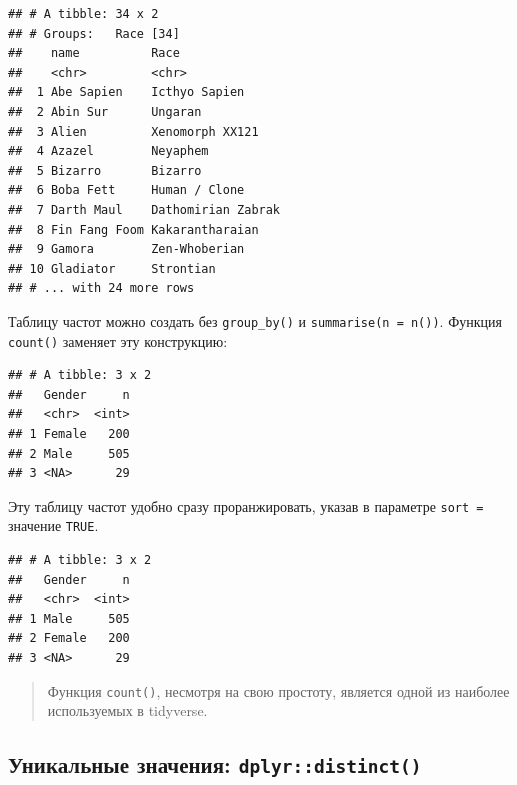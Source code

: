 \documentclass[]{book}
\newenvironment{Shaded}{\begin{snugshade}}{\end{snugshade}}
\newcommand{\KeywordTok}[1]{\textcolor[rgb]{0.13,0.29,0.53}{\textbf{#1}}}
\newcommand{\DataTypeTok}[1]{\textcolor[rgb]{0.13,0.29,0.53}{#1}}
\newcommand{\StringTok}[1]{\textcolor[rgb]{0.31,0.60,0.02}{#1}}
\newcommand{\OtherTok}[1]{\textcolor[rgb]{0.56,0.35,0.01}{#1}}
\newcommand{\OperatorTok}[1]{\textcolor[rgb]{0.81,0.36,0.00}{\textbf{#1}}}
\newcommand{\NormalTok}[1]{#1}
\begin{document}
\begin{verbatim}
## # A tibble: 34 x 2
## # Groups:   Race [34]
##    name          Race              
##    <chr>         <chr>             
##  1 Abe Sapien    Icthyo Sapien     
##  2 Abin Sur      Ungaran           
##  3 Alien         Xenomorph XX121   
##  4 Azazel        Neyaphem          
##  5 Bizarro       Bizarro           
##  6 Boba Fett     Human / Clone     
##  7 Darth Maul    Dathomirian Zabrak
##  8 Fin Fang Foom Kakarantharaian   
##  9 Gamora        Zen-Whoberian     
## 10 Gladiator     Strontian         
## # ... with 24 more rows
\end{verbatim}

Таблицу частот можно создать без \texttt{group\_by()} и
\texttt{summarise(n\ =\ n())}. Функция \texttt{count()} заменяет эту
конструкцию:

\begin{Shaded}
\end{Shaded}

\begin{verbatim}
## # A tibble: 3 x 2
##   Gender     n
##   <chr>  <int>
## 1 Female   200
## 2 Male     505
## 3 <NA>      29
\end{verbatim}

Эту таблицу частот удобно сразу проранжировать, указав в параметре
\texttt{sort\ =} значение \texttt{TRUE}.

\begin{Shaded}
\end{Shaded}

\begin{verbatim}
## # A tibble: 3 x 2
##   Gender     n
##   <chr>  <int>
## 1 Male     505
## 2 Female   200
## 3 <NA>      29
\end{verbatim}

\begin{quote}
Функция \texttt{count()}, несмотря на свою простоту, является одной из
наиболее используемых в tidyverse.
\end{quote}

\subsection{\texorpdfstring{Уникальные значения:
\texttt{dplyr::distinct()}}{Уникальные значения: dplyr::distinct()}}\label{tidy_distinct}
\end{document}
